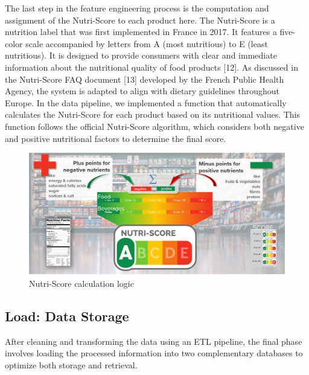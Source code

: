 \par The last step in the feature engineering process is the computation and assignment of the
Nutri-Score to each product here. The Nutri-Score is a nutrition label that was first implemented in France
in 2017. It features a five-color scale accompanied by letters from A (most
nutritious) to E (least nutritious). It is designed to provide consumers
with clear and immediate information about the nutritional quality of
food products [12]. As discussed in the Nutri-Score FAQ document [13]
developed by the French Public Health Agency, the system is adapted to
align with dietary guidelines throughout Europe. In the data pipeline,
we implemented a function that automatically calculates the Nutri-Score
for each product based on its nutritional values. This function follows
the official Nutri-Score algorithm, which considers both negative and
positive nutritional factors to determine the final score.



\begin{center}
\begin{figure}[H]
    \includegraphics[scale=0.98]{images/nutriscore.jpg}
    \caption{Nutri-Score calculation logic} 
    \label{fig: add_nutriscore}
\end{figure}
\end{center}

\subsection{Load: Data Storage}
After cleaning and transforming the data using an ETL pipeline, the final
phase involves loading the processed information into two complementary
databases to optimize both storage and retrieval.

